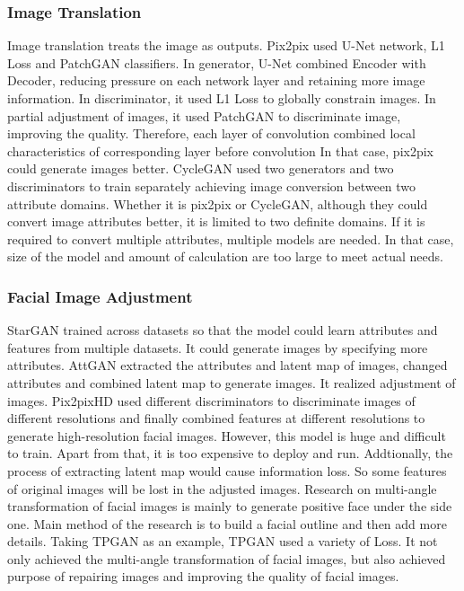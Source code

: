 \subsubsection*{Image Translation}
Image translation treats the image as outputs.
Pix2pix used U-Net network, L1 Loss and PatchGAN classifiers.
In generator, U-Net combined Encoder with Decoder,
    reducing pressure on each network layer and retaining more image information.
In discriminator, it used L1 Loss to globally constrain images.
In partial adjustment of images,
    it used PatchGAN to discriminate image, improving the quality.
Therefore, each layer of convolution combined local characteristics of corresponding layer before convolution
    In that case, pix2pix could generate images better.
CycleGAN used two generators and two discriminators to train separately achieving image conversion between two attribute domains.
Whether it is pix2pix or CycleGAN,
    although they could convert image attributes better,
    it is limited to two definite domains.
If it is required to convert multiple attributes, multiple models are needed.
In that case, size of the model and amount of calculation are too large to meet actual needs.

\subsubsection*{Facial Image Adjustment}
StarGAN trained across datasets so that the model could learn attributes and features from multiple datasets.
It could generate images by specifying more attributes.
AttGAN extracted the attributes and latent map of images,
    changed attributes and combined latent map to generate images.
It realized adjustment of images.
Pix2pixHD used different discriminators to discriminate images of different resolutions
    and finally combined features at different resolutions to generate high-resolution facial images.
However, this model is huge and difficult to train.
Apart from that, it is too expensive to deploy and run.
Addtionally, the process of extracting latent map would cause information loss.
So some features of original images will be lost in the adjusted images.
Research on multi-angle transformation of facial images is mainly to generate positive face under the side one.
Main method of the research is to build a facial outline and then add more details.
Taking TPGAN as an example, TPGAN used a variety of Loss.
It not only achieved the multi-angle transformation of facial images,
    but also achieved purpose of repairing images and improving the quality of facial images.

